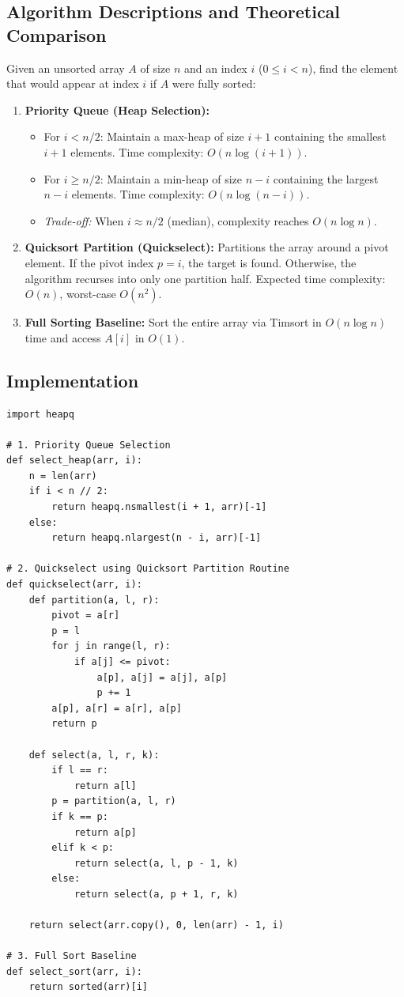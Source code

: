 \documentclass[12pt]{article}
\begin{document}
\subsection{Algorithm Descriptions and Theoretical Comparison}
Given an unsorted array $A$ of size $n$ and an index $i$ ($0 \le i < n$), find the element that would appear at index $i$ if $A$ were fully sorted:

\begin{enumerate}
    \item \textbf{Priority Queue (Heap Selection):}
    \begin{itemize}
        \item For $i < n/2$: Maintain a max-heap of size $i+1$ containing the smallest $i+1$ elements. Time complexity: $O(n \log (i+1))$.
        \item For $i \ge n/2$: Maintain a min-heap of size $n-i$ containing the largest $n-i$ elements. Time complexity: $O(n \log (n-i))$.
        \item \textit{Trade-off:} When $i \approx n/2$ (median), complexity reaches $O(n \log n)$.
    \end{itemize}
    \item \textbf{Quicksort Partition (Quickselect):} Partitions the array around a pivot element. If the pivot index $p = i$, the target is found. Otherwise, the algorithm recurses into only one partition half. Expected time complexity: $O(n)$, worst-case $O(n^2)$.
    \item \textbf{Full Sorting Baseline:} Sort the entire array via Timsort in $O(n \log n)$ time and access $A[i]$ in $O(1)$.
\end{enumerate}

\subsection{Implementation}
\begin{lstlisting}[style=code]
import heapq

# 1. Priority Queue Selection
def select_heap(arr, i):
    n = len(arr)
    if i < n // 2:
        return heapq.nsmallest(i + 1, arr)[-1]
    else:
        return heapq.nlargest(n - i, arr)[-1]

# 2. Quickselect using Quicksort Partition Routine
def quickselect(arr, i):
    def partition(a, l, r):
        pivot = a[r]
        p = l
        for j in range(l, r):
            if a[j] <= pivot:
                a[p], a[j] = a[j], a[p]
                p += 1
        a[p], a[r] = a[r], a[p]
        return p

    def select(a, l, r, k):
        if l == r:
            return a[l]
        p = partition(a, l, r)
        if k == p:
            return a[p]
        elif k < p:
            return select(a, l, p - 1, k)
        else:
            return select(a, p + 1, r, k)

    return select(arr.copy(), 0, len(arr) - 1, i)

# 3. Full Sort Baseline
def select_sort(arr, i):
    return sorted(arr)[i]
\end{lstlisting}
\end{document}
